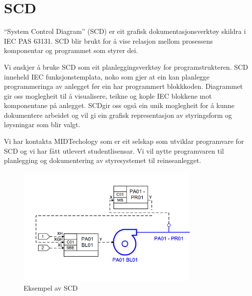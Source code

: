 \section{SCD}
\thispagestyle{fancy}


``System Control Diagram'' (\gls{SCD})  er eit grafisk dokumentasjonsverktøy skildra i \gls{IEC} \gls{PAS} 63131.\newline
 \gls{SCD} blir brukt for å vise relasjon mellom prosessens komponentar og programmet som styrer dei.
 
 Vi ønskjer å bruke \gls{SCD} som eit planleggingsverktøy for programstrukteren. \gls{SCD} inneheld \gls{IEC} funksjonstemplata, noko som gjer at ein kan
 planlegge programmeringa av anlegget før ein har programmert blokkkoden.
 Diagrammet gir oss moglegheit til å visualisere, teikne og kople \gls{IEC} blokkene mot komponentane på anlegget.
 \gls{SCD}gir oss også ein unik moglegheit for å kunne dokumentere arbeidet og vil gi ein grafisk representasjon
 av styringsform og løysningar som blir valgt.

 Vi har kontakta MIDTechology \citep{MIDT} som er eit selskap som utviklar programvare for \gls{SCD} og vi har fått utlevert studentlisensar. 
 Vi vil nytte programvaren til planlegging og dokumentering av styresystemet til reinseanlegget. \newline \newline \newline

 \begin{figure}[htbp]
    \centering
    \includegraphics[width=0.8\textwidth]{Bilder/Visio_eksempel.png}
    \caption{Eksempel av \gls{SCD}}\label{fig:SCD eksempel}    
\end{figure}

\newpage